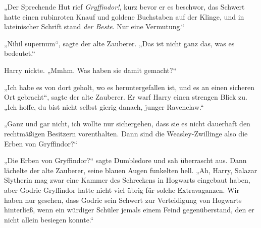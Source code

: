 „Der Sprechende Hut rief \emph{Gryffindor!}, kurz bevor er es beschwor, das Schwert hatte einen rubinroten Knauf und goldene Buchstaben auf der Klinge, und in lateinischer Schrift stand \emph{der Beste}. Nur eine Vermutung.“

„Nihil supernum“, sagte der alte Zauberer.
„Das ist nicht ganz das, was es bedeutet.“

Harry nickte.
„Mmhm. Was haben sie damit gemacht?“

„Ich habe es von dort geholt, wo es heruntergefallen ist, und es an einen sicheren Ort gebracht“, sagte der alte Zauberer. Er warf Harry einen strengen Blick zu.
„Ich hoffe, du bist nicht selbst gierig danach, junger Ravenclaw.“

„Ganz und gar nicht, ich wollte nur sichergehen, dass sie es nicht dauerhaft den rechtmäßigen Besitzern vorenthalten. Dann sind die Weasley-Zwillinge also die Erben von Gryffindor?“

„Die Erben von Gryffindor?“ sagte Dumbledore und sah überrascht aus. Dann lächelte der alte Zauberer, seine blauen Augen funkelten hell.
„Ah, Harry, Salazar Slytherin mag zwar eine Kammer des Schreckens in Hogwarts eingebaut haben, aber Godric Gryffindor hatte nicht viel übrig für solche Extravaganzen. Wir haben nur gesehen, dass Godric sein Schwert zur Verteidigung von Hogwarts hinterließ, wenn ein würdiger Schüler jemals einem Feind gegenüberstand, den er nicht allein besiegen konnte.“

